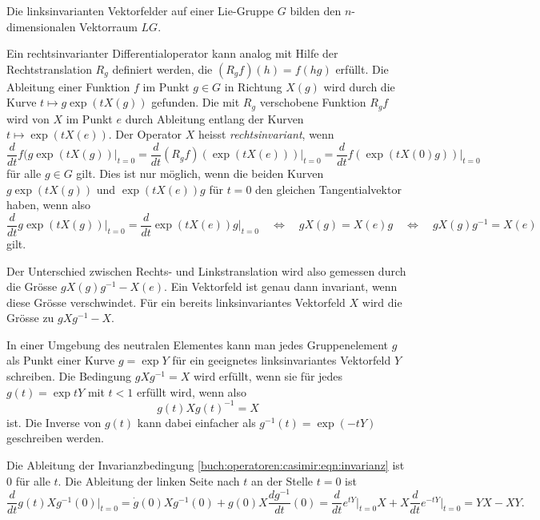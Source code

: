 \begin{definition}
Die linksinvarianten Vektorfelder auf einer Lie-Gruppe $G$ bilden 
den $n$-dimensionalen Vektorraum $LG$.
\end{definition}

Ein rechtsinvarianter Differentialoperator kann analog mit Hilfe
der Rechtstranslation $R_g$ definiert werden, die $(R_gf)(h) = f(hg)$
erfüllt.
Die Ableitung einer Funktion $f$ im Punkt $g\in G$ in Richtung $X(g)$
wird durch die Kurve $t\mapsto g\exp(tX(g))$ gefunden.
Die mit $R_g$ verschobene Funktion $R_gf$ wird von $X$ im Punkt $e$
durch Ableitung entlang der Kurven $t\mapsto \exp(tX(e))$.
Der Operator $X$ heisst {\em rechtsinvariant}, wenn 
\[
\frac{d}{dt} f(g\exp(tX(g))\bigg|_{t=0}
=
\frac{d}{dt} (R_gf)(\exp(tX(e)))\bigg|_{t=0}
=
\frac{d}{dt} f(\exp(tX(0)g))\bigg|_{t=0}
\]
für alle $g\in G$ gilt.
Dies ist nur möglich, wenn die beiden Kurven
$g\exp(tX(g))$
und 
$\exp(tX(e))g$
für $t=0$ den gleichen Tangentialvektor haben, wenn also
\[
\frac{d}{dt}g\exp(tX(g))\bigg|_{t=0}
=
\frac{d}{dt}\exp(tX(e))g\bigg|_{t=0}
\quad\Leftrightarrow\quad
gX(g) = X(e)g
\quad\Leftrightarrow\quad
gX(g)g^{-1} = X(e)
\]
gilt.

Der Unterschied zwischen Rechts- und Linkstranslation wird also gemessen
durch die Grösse $gX(g)g^{-1}-X(e)$.
Ein Vektorfeld ist genau dann invariant, wenn diese Grösse verschwindet.
Für ein bereits linksinvariantes Vektorfeld $X$ wird die Grösse zu
$gXg^{-1}-X$.

In einer Umgebung des neutralen Elementes kann man jedes Gruppenelement
$g$ als Punkt einer Kurve $g=\exp Y$ für ein geeignetes linksinvariantes
Vektorfeld $Y$ schreiben.
Die Bedingung $gXg^{-1}=X$ wird erfüllt, wenn sie für jedes $g(t)=\exp tY$
mit $t<1$ erfüllt wird, wenn also
\begin{equation}
g(t)Xg(t)^{-1}=X
\label{buch:operatoren:casimir:eqn:invarianz}
\end{equation}
ist.
Die Inverse von $g(t)$ kann dabei einfacher als $g^{-1}(t)=\exp(-tY)$
geschreiben werden.

Die Ableitung der Invarianzbedingung
\eqref{buch:operatoren:casimir:eqn:invarianz}
ist $0$ für alle $t$.
Die Ableitung der linken Seite nach $t$ an der Stelle $t=0$ ist
\begin{equation}
\frac{d}{dt} g(t)Xg^{-1}(0)\bigg|_{t=0}
=
\dot{g}(0)Xg^{-1}(0)
+
g(0) X \frac{dg^{-1}}{dt}(0)
=
\frac{d}{dt}e^{tY}\bigg|_{t=0}
X
+
X
\frac{d}{dt}e^{-tY}\bigg|_{t=0}
=
YX-XY.
\label{buch:operatoren:casimir:eqn:innad}
\end{equation}

